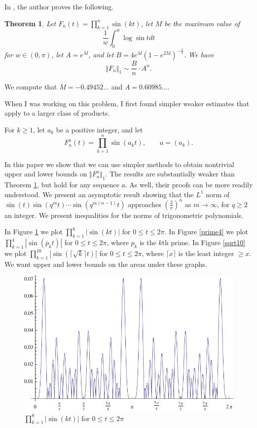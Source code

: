 \documentclass{article}
\newcommand{\norm}[1]{\Vert #1 \Vert}
\newtheorem{theorem}{Theorem}
\begin{document}
In \cite[p.~532, Theorem 2]{MR3061031}, the author proves the following.

\begin{theorem}
Let $F_n(t)=\prod_{k=1}^n \sin(kt)$, let $M$ be the maximum value of
\[
\frac{1}{w} \int_0^w \log \sin t dt
\]
for $w \in (0,\pi)$, let $A=e^M$, and let $B=4e^M\left(1-e^{2M} \right)^{-\frac{1}{4}}$. 
We have
\[
\norm{F_n}_1 \sim \frac{B}{n} \cdot A^n.
\]
\label{bell}
\end{theorem}

We compute that $M=-0.49452\ldots$ and $A=0.60985\ldots$.

When I was working on this problem, I first found simpler weaker estimates that apply to a larger class of products.

For $k \geq 1$, let $a_k$ be a positive integer, and let 
\[
F^a_n(t)=\prod_{k=1}^n \sin (a_k t), \qquad a=(a_k).
\]



In this paper we show that we can use simpler methods to obtain nontrivial upper and lower bounds on $\norm{F_n^a}_1$.
The results are substantially weaker than Theorem \ref{bell}, but hold for any sequence $a$. As well, their proofs can be more readily understood. 
We  present an asymptotic result showing that the $L^1$ norm of $\sin(t)\sin(q^m t)\cdots \sin(q^{m(n-1)}t)$ approaches
$\left( \frac{2}{\pi} \right)^n$ as $m \to \infty$, for $q \geq 2$ an integer. We present inequalities
for the norms of trigonometric polynomials.

In Figure \ref{k8} we plot $\prod_{k=1}^8 |\sin(kt)|$ for $0 \leq t \leq 2\pi$. In Figure \ref{prime4} we plot $\prod_{k=1}^4 |\sin(p_k t)|$ for $0 \leq t \leq 2\pi$, where $p_k$ is the $k$th prime. In Figure \ref{sqrt10} we plot $\prod_{k=1}^{10} |\sin(\lceil \sqrt{k} \rceil t)|$ for $0 \leq t \leq 2\pi$, where $\lceil x \rceil$ is the least integer $\geq x$. 
We want upper and lower bounds on the areas under these graphs.

\begin{center}
\begin{figure}
\includegraphics[scale=0.95]{k8}
\caption{$\prod_{k=1}^8 |\sin(kt)|$ for $0 \leq t \leq 2\pi$}
\label{k8}
\end{figure}
\end{center}
\end{document}
